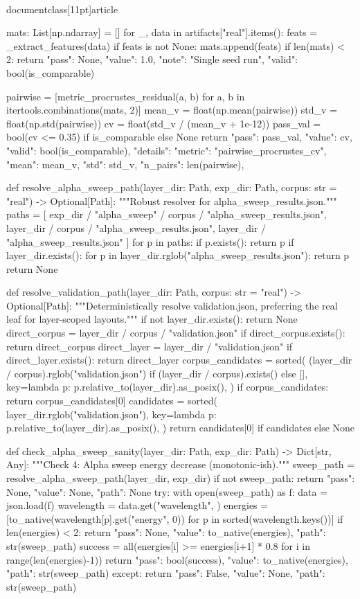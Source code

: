 \\documentclass[11pt]{article}
\begin{document}
\begin{CodeBlock}
    mats: List[np.ndarray] = []
    for _, data in artifacts["real"].items():
        feats = _extract_features(data)
        if feats is not None:
            mats.append(feats)
    if len(mats) < 2:
        return {"pass": None, "value": 1.0, "note": "Single seed run", "valid": bool(is_comparable)}

    pairwise = [metric_procrustes_residual(a, b) for a, b in itertools.combinations(mats, 2)]
    mean_v = float(np.mean(pairwise))
    std_v = float(np.std(pairwise))
    cv = float(std_v / (mean_v + 1e-12))
    pass_val = bool(cv <= 0.35) if is_comparable else None
    return {
        "pass": pass_val,
        "value": cv,
        "valid": bool(is_comparable),
        "details": {"metric": "pairwise_procrustes_cv", "mean": mean_v, "std": std_v, "n_pairs": len(pairwise)},
    }

def resolve_alpha_sweep_path(layer_dir: Path, exp_dir: Path, corpus: str = "real") -> Optional[Path]:
    """Robust resolver for alpha_sweep_results.json."""
    paths = [
        exp_dir / "alpha_sweep" / corpus / "alpha_sweep_results.json",
        layer_dir / corpus / "alpha_sweep_results.json",
        layer_dir / "alpha_sweep_results.json"
    ]
    for p in paths:
        if p.exists(): return p
    if layer_dir.exists():
        for p in layer_dir.rglob("alpha_sweep_results.json"): return p
    return None

def resolve_validation_path(layer_dir: Path, corpus: str = "real") -> Optional[Path]:
    """Deterministically resolve validation.json, preferring the real leaf for layer-scoped layouts."""
    if not layer_dir.exists():
        return None
    direct_corpus = layer_dir / corpus / "validation.json"
    if direct_corpus.exists():
        return direct_corpus
    direct_layer = layer_dir / "validation.json"
    if direct_layer.exists():
        return direct_layer
    corpus_candidates = sorted(
        (layer_dir / corpus).rglob("validation.json") if (layer_dir / corpus).exists() else [],
        key=lambda p: p.relative_to(layer_dir).as_posix(),
    )
    if corpus_candidates:
        return corpus_candidates[0]
    candidates = sorted(
        layer_dir.rglob("validation.json"),
        key=lambda p: p.relative_to(layer_dir).as_posix(),
    )
    return candidates[0] if candidates else None

def check_alpha_sweep_sanity(layer_dir: Path, exp_dir: Path) -> Dict[str, Any]:
    """Check 4: Alpha sweep energy decrease (monotonic-ish)."""
    sweep_path = resolve_alpha_sweep_path(layer_dir, exp_dir)
    if not sweep_path: return {"pass": None, "value": None, "path": None}
    try:
        with open(sweep_path) as f: data = json.load(f)
        wavelength = data.get("wavelength", {})
        energies = [to_native(wavelength[p].get("energy", 0)) for p in sorted(wavelength.keys())]
        if len(energies) < 2: return {"pass": None, "value": to_native(energies), "path": str(sweep_path)}
        success = all(energies[i] >= energies[i+1] * 0.8 for i in range(len(energies)-1))
        return {"pass": bool(success), "value": to_native(energies), "path": str(sweep_path)}
    except: return {"pass": False, "value": None, "path": str(sweep_path)}


\end{CodeBlock}
\end{document}
